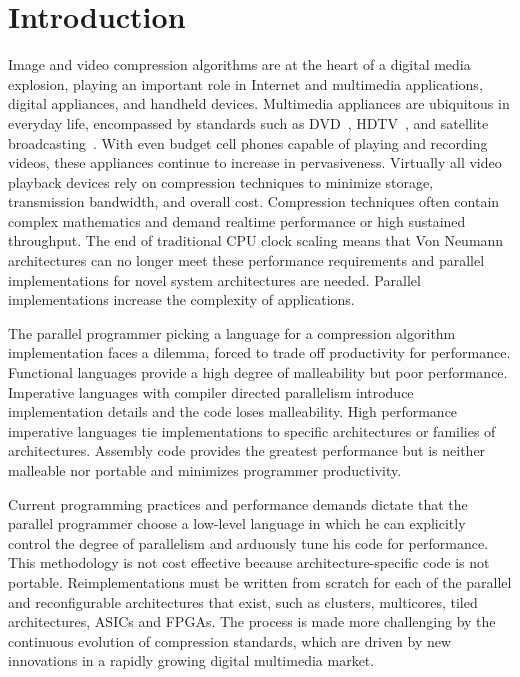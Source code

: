 \chapter{Introduction}

Image and video compression algorithms are at the heart of a digital 
media explosion, playing an important role in Internet and multimedia 
applications, digital appliances, and handheld devices. Multimedia 
appliances are ubiquitous in everyday life, encompassed by standards 
such as DVD~\cite{Taylor:1999:SDV}, HDTV~\cite{DVB}, and satellite 
broadcasting~\cite{directv}. With even budget cell phones capable of 
playing and recording videos, these appliances continue to increase in 
pervasiveness. Virtually all video playback devices rely on compression 
techniques to minimize storage, transmission bandwidth, and overall cost. 
Compression techniques often contain complex mathematics and demand 
realtime performance or high sustained throughput. The end of traditional 
CPU clock scaling means that Von Neumann architectures can no longer meet 
these performance requirements and parallel implementations for novel 
system architectures are needed. Parallel implementations increase the 
complexity of applications.

The parallel programmer picking a language
for a compression algorithm implementation
faces a dilemma, forced to trade 
off productivity for performance. Functional 
languages provide a high degree of malleability but poor performance. 
Imperative languages with compiler directed 
parallelism introduce implementation details and the code 
loses malleability. High performance imperative languages
tie implementations to specific architectures or families of 
architectures. Assembly code provides the greatest performance 
but is neither malleable nor portable and minimizes programmer productivity. 

Current programming practices and performance demands dictate that the 
parallel programmer choose a low-level language in which he can explicitly 
control the degree of parallelism and arduously tune his code for performance. 
This methodology is not cost effective because architecture-specific code is 
not portable. Reimplementations must be written from scratch for each of the 
parallel and reconfigurable architectures that exist, such as clusters, 
multicores, tiled architectures, ASICs and FPGAs. The process is made more 
challenging by the continuous evolution of compression standards, which are 
driven by new innovations in a rapidly growing digital multimedia market. 

